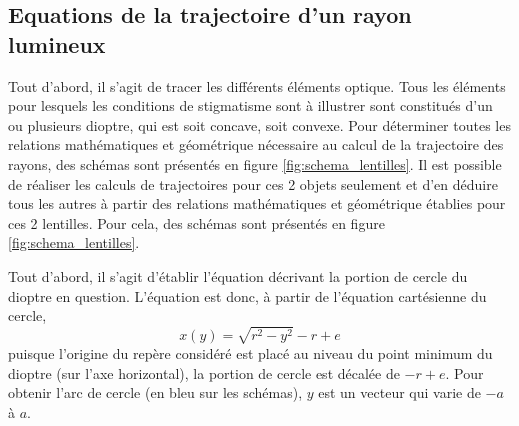 \documentclass[a4paper, 11pt]{article}
\begin{document}
\subsection{Equations de la trajectoire d'un rayon lumineux}
Tout d'abord, il s'agit de tracer les différents éléments optique. Tous les éléments pour lesquels les conditions de stigmatisme sont à illustrer sont constitués d'un ou plusieurs dioptre, qui est soit concave, soit convexe. Pour déterminer toutes les relations mathématiques et géométrique nécessaire au calcul de la trajectoire des rayons, des schémas sont présentés en figure \ref{fig:schema_lentilles}. Il est possible de réaliser les calculs de trajectoires pour ces 2 objets seulement et d'en déduire tous les autres à partir des relations mathématiques et géométrique établies pour ces 2 lentilles. Pour cela, des schémas sont présentés en figure \ref{fig:schema_lentilles}.

Tout d'abord, il s'agit d'établir l'équation décrivant la portion de cercle du dioptre en question. L'équation est donc, à partir de l'équation cartésienne du cercle,
\begin{equation}
	x(y) = \sqrt{r^2 - y^2} - r + e
\end{equation}
puisque l'origine du repère considéré est placé au niveau du point minimum du dioptre (sur l'axe horizontal), la portion de cercle est décalée de $-r+e$. Pour obtenir l'arc de cercle (en bleu sur les schémas), $y$ est un vecteur qui varie de $-a$ à $a$.
\end{document}
